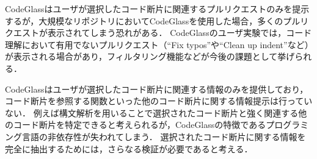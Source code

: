 
CodeGlassはユーザが選択したコード断片に関連するプルリクエストのみを提示するが，大規模なリポジトリにおいてCodeGlassを使用した場合，多くのプルリクエストが表示されてしまう恐れがある．
CodeGlassのユーザ実験では，コード理解において有用でないプルリクエスト（``Fix typos''や``Clean up indent''など）が表示される場合があり，フィルタリング機能などが今後の課題として挙げられる．


CodeGlassはユーザが選択したコード断片に関連する情報のみを提供しており，コード断片を参照する関数といった他のコード断片に関する情報提示は行っていない．
例えば構文解析を用いることで選択されたコード断片と強く関連する他のコード断片を特定できると考えられるが，CodeGlassの特徴であるプログラミング言語の非依存性が失われてしまう．
選択されたコード断片に関する情報を完全に抽出するためには，さらなる検証が必要であると考える．